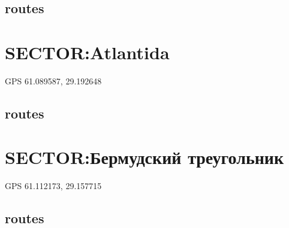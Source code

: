 \documentclass[8pt, a5paper,notitlepage,openany]{report}
\begin{document}
\section*{routes}


\clearpage 
\chapter{SECTOR:Atlantida}
 GPS 61.089587, 29.192648
%
\newpage
\section*{routes}

 
\clearpage 
\chapter{SECTOR:Бермудский треугольник}
GPS 61.112173, 29.157715
%
\newpage
\section*{routes}





 
\end{document}
